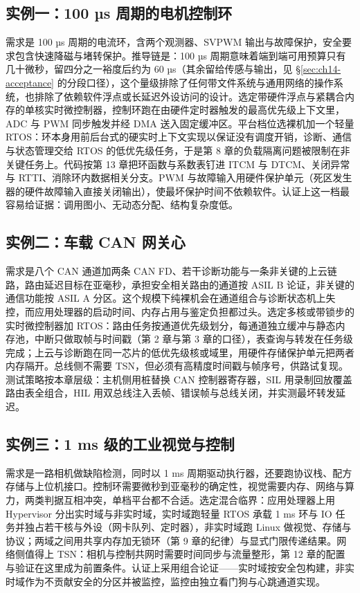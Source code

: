 \documentclass[12pt,a4paper,fontset=fandol]{ctexbook}
\newcommand{\Lang}[1]{\textsf{#1}}
\begin{document}
\subsection{实例一：100 µs 周期的电机控制环}

需求是 100 µs 周期的电流环，含两个观测器、SVPWM 输出与故障保护，安全要求包含快速降磁与堵转保护。推导链是：100 µs 周期意味着端到端可用预算只有几十微秒，留四分之一裕度后约为 60 µs（其余留给传感与输出，见 \S\ref{sec:ch14-acceptance} 的分段口径），这个量级排除了任何带文件系统与通用网络的操作系统，也排除了依赖软件浮点或长延迟外设访问的设计。选定带硬件浮点与紧耦合内存的单核实时微控制器，控制环跑在由硬件定时器触发的最高优先级上下文里，ADC 与 PWM 同步触发并经 DMA 送入固定缓冲区。平台档位选裸机加一个轻量 RTOS：环本身用前后台式的硬实时上下文实现以保证没有调度开销，诊断、通信与状态管理交给 RTOS 的低优先级任务，于是第 8 章的负载隔离问题被限制在非关键任务上。代码按第 13 章把环函数与系数表钉进 ITCM 与 DTCM、关闭异常与 RTTI、消除环内数据相关分支。PWM 与故障输入用硬件保护单元（死区发生器的硬件故障输入直接关闭输出），使最坏保护时间不依赖软件。认证上这一档最容易给证据：调用图小、无动态分配、结构复杂度低。

\subsection{实例二：车载 CAN 网关心}

需求是八个 CAN 通道加两条 CAN FD、若干诊断功能与一条非关键的上云链路，路由延迟目标在亚毫秒，承担安全相关路由的通道按 ASIL B 论证，非关键的通信功能按 ASIL A 分区。这个规模下纯裸机会在通道组合与诊断状态机上失控，而应用处理器的启动时间、内存占用与鉴定负担都过头。选定多核或带锁步的实时微控制器加 RTOS：路由任务按通道优先级划分，每通道独立缓冲与静态内存池，中断只做取帧与时间戳（第 2 章与第 3 章的口径），表查询与转发在任务级完成；上云与诊断跑在同一芯片的低优先级核或域里，用硬件存储保护单元把两者内存隔开。总线侧不需要 TSN，但必须有高精度时间戳与帧序号，供路试复现。测试策略按本章层级：主机侧用桩替换 CAN 控制器寄存器，SIL 用录制回放覆盖路由表全组合，HIL 用双总线注入丢帧、错误帧与总线关闭，并实测最坏转发延迟。

\subsection{实例三：1 ms 级的工业视觉与控制}

需求是一路相机做缺陷检测，同时以 1 ms 周期驱动执行器，还要跑协议栈、配方存储与上位机接口。控制环需要微秒到亚毫秒的确定性，视觉需要内存、网络与算力，两类判据互相冲突，单档平台都不合适。选定混合临界：应用处理器上用 Hypervisor 分出实时域与非实时域，实时域跑轻量 RTOS 承载 1 ms 环与 IO 任务并独占若干核与外设（网卡队列、定时器），非实时域跑 \Lang{Linux} 做视觉、存储与协议；两域之间用共享内存加无锁环（第 9 章的纪律）与显式门限传递结果。网络侧值得上 TSN：相机与控制共网时需要时间同步与流量整形，第 12 章的配置与验证在这里成为前置条件。认证上采用组合论证——实时域按安全包构建，非实时域作为不贡献安全的分区并被监控，监控由独立看门狗与心跳通道实现。
\end{document}

